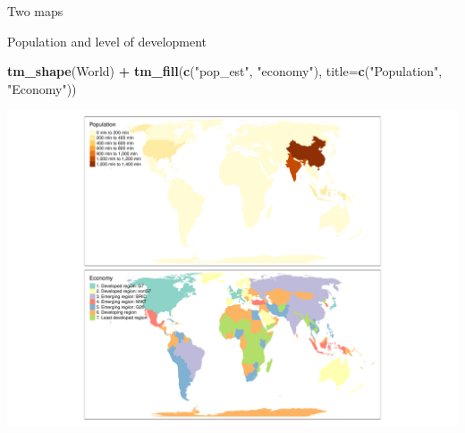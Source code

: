 \documentclass[
  ignorenonframetext,
]{beamer}
\newenvironment{Shaded}{\begin{snugshade}}{\end{snugshade}}
\newcommand{\DataTypeTok}[1]{\textcolor[rgb]{0.13,0.29,0.53}{#1}}
\newcommand{\KeywordTok}[1]{\textcolor[rgb]{0.13,0.29,0.53}{\textbf{#1}}}
\newcommand{\NormalTok}[1]{#1}
\newcommand{\OperatorTok}[1]{\textcolor[rgb]{0.81,0.36,0.00}{\textbf{#1}}}
\newcommand{\StringTok}[1]{\textcolor[rgb]{0.31,0.60,0.02}{#1}}
\begin{document}
\begin{frame}[fragile]{Two maps}
\protect\hypertarget{two-maps}{}
\begin{block}{Population and level of development}
\protect\hypertarget{population-and-level-of-development}{}
\begin{Shaded}
\begin{Highlighting}[]
\KeywordTok{tm\_shape}\NormalTok{(World) }\OperatorTok{+}\StringTok{ }\KeywordTok{tm\_fill}\NormalTok{(}\KeywordTok{c}\NormalTok{(}\StringTok{"pop\_est"}\NormalTok{, }\StringTok{"economy"}\NormalTok{), }
        \DataTypeTok{title=}\KeywordTok{c}\NormalTok{(}\StringTok{"Population"}\NormalTok{, }\StringTok{"Economy"}\NormalTok{))}
\end{Highlighting}
\end{Shaded}

\includegraphics{quick_high_quality_maps_files/figure-beamer/unnamed-chunk-11-1.pdf}
\end{block}
\end{frame}
\end{document}
